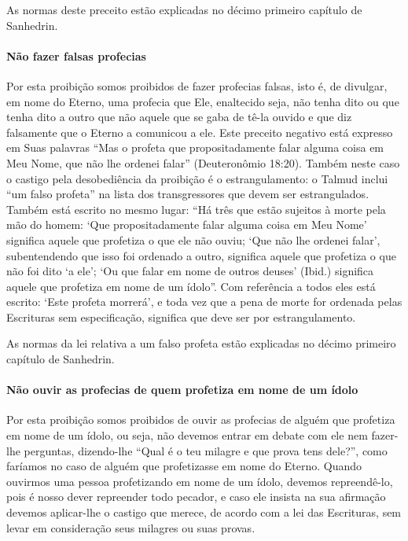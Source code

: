 As normas deste preceito estão explicadas no décimo primeiro capítulo
de Sanhedrin.

\paragraph{Não fazer falsas profecias}

Por esta proibição somos proibidos de fazer profecias falsas, isto é,
de divulgar, em nome do Eterno, uma profecia que Ele, enaltecido seja,
não tenha dito ou que tenha dito a outro que não aquele que se gaba de tê-la
ouvido e que diz falsamente que o Eterno a comunicou a ele. Este
preceito negativo está expresso em Suas palavras ``Mas o profeta que propositadamente
falar alguma coisa em Meu Nome, que não lhe ordenei falar''
(Deuteronômio 18:20).
Também neste caso o castigo pela desobediência da proibição é o
estrangulamento: o Talmud inclui ``um falso profeta'' na lista dos
transgressores que devem ser estrangulados. Também está escrito no mesmo
lugar: ``Há três que estão sujeitos à morte pela mão do homem: `Que propositadamente
falar alguma coisa em Meu Nome' significa aquele que profetiza o que ele
não ouviu; `Que não lhe ordenei falar', subentendendo que isso foi
ordenado a outro, significa aquele que profetiza o que não foi dito `a
ele'; `Ou que falar em nome de outros deuses' (Ibid.) significa aquele
que profetiza em nome de um ídolo''. Com referência a todos eles está
escrito: `Este profeta morrerá', e toda vez que a pena de morte for
ordenada pelas Escrituras sem especificação, significa que deve ser por
estrangulamento.

As normas da lei relativa a um falso profeta estão explicadas no décimo
primeiro capítulo de Sanhedrin.

\paragraph{Não ouvir as profecias de quem profetiza em nome de um ídolo}

Por esta proibição somos proibidos de ouvir as profecias de alguém que
profetiza em nome de um ídolo, ou seja, não devemos entrar em debate com
ele nem fazer-lhe perguntas, dizendo-lhe ``Qual é o teu milagre e que
prova tens dele?'', como faríamos no caso de alguém que profetizasse em
nome do Eterno. Quando ouvirmos uma pessoa profetizando em nome de um
ídolo, devemos repreendê-lo, pois é nosso dever repreender todo pecador,
e caso ele insista na sua afirmação devemos aplicar-lhe o castigo que
merece, de acordo com a lei das Escrituras, sem levar em consideração
seus milagres ou suas provas.

